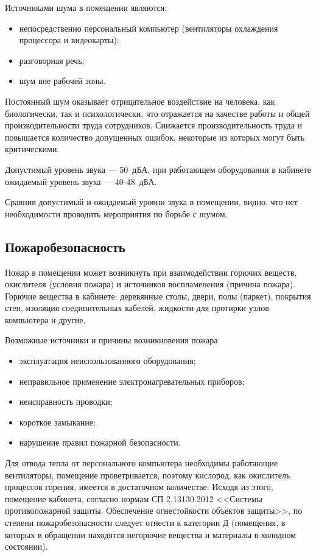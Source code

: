Источниками шума в помещении являются:
\begin{itemize}
  \item непосредственно персональный компьютер (вентиляторы охлаждения процессора и видеокарты);
  \item разговорная речь;
  \item шум вне рабочей зоны.
\end{itemize}

Постоянный шум оказывает отрицательное воздействие на человека, как биологически, так и психологически, что отражается на качестве работы и общей производительности труда сотрудников.
Снижается производительность труда и повышается количество допущенных ошибок, некоторые из которых могут быть критическими.

Допустимый уровень звука --- 50~дБА, при работающем оборудовании в кабинете ожидаемый уровень звука --- 40-48~дБА.

Сравнив допустимый и ожидаемый уровни звука в помещении, видно, что нет необходимости проводить мероприятия по борьбе с шумом.

\subsection{Пожаробезопасность}

Пожар в помещении может возникнуть при взаимодействии горючих веществ, окислителя (условия пожара) и источников воспламенения (причина пожара).
Горючие вещества в кабинете: деревянные столы, двери, полы (паркет), покрытия стен, изоляция соединительных кабелей, жидкости для протирки узлов компьютера и другие.

Возможные источники и причины возникновения пожара:
\begin{itemize}
  \item эксплуатация неиспользованного оборудования;
  \item неправильное применение электронагревательных приборов;
  \item неисправность проводки;
  \item короткое замыкание;
  \item нарушение правил пожарной безопасности.
\end{itemize}

Для отвода тепла от персонального компьютера необходимы работающие вентиляторы, помещение проветривается, поэтому кислород, как окислитель процессов горения, имеется в достаточном количестве.
Исходя из этого, помещение кабинета, согласно нормам СП 2.13130.2012 <<Системы противопожарной защиты. Обеспечение огнестойкости объектов защиты>>, по степени пожаробезопасности следует отнести к категории Д (помещения, в которых в обращении находятся негорючие вещества и материалы в холодном состоянии).

